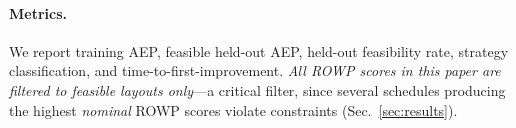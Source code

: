 \paragraph{Metrics.}
We report training AEP, feasible held-out AEP, held-out feasibility
rate, strategy classification, and time-to-first-improvement.
\emph{All ROWP scores in this paper are filtered to feasible
layouts only}---a critical filter, since several schedules
producing the highest \emph{nominal} ROWP scores violate
constraints (Sec.~\ref{sec:results}).
